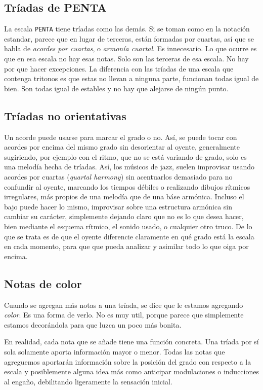 \documentclass[]{article}
\begin{document}
\subsection{Tríadas de PENTA}

La escala \texttt{PENTA} tiene tríadas como las demás. Si se toman como en la notación estandar, parece que en lugar de terceras, están formadas por cuartas, así que se habla de \emph{acordes por cuartas}, o \emph{armonía cuartal}. Es innecesario. Lo que ocurre es que en esa escala no hay esas notas. Solo son las terceras de esa escala. No hay por que hacer excepciones. La diferencia con las tríadas de una escala que contenga tritonos es que estas no llevan a ninguna parte, funcionan todas igual de bien. Son todas igual de estables y no hay que alejarse de ningún punto.

\subsection{Tríadas no orientativas}

Un acorde puede usarse para marcar el grado o no. Así, se puede tocar con acordes por encima del mismo grado sin desorientar al oyente, generalmente sugiriendo, por ejemplo con el ritmo, que no se está variando de grado, solo es una melodía hecha de tríadas. Así, los músicos de jazz, suelen improvisar usando acordes por cuartas (\emph{quartal harmony}) sin acentuarlos demasiado para no confundir al oyente, marcando los tiempos débiles o realizando dibujos rítmicos irregulares, más propios de una melodía que de una báse armónica. Incluso el bajo puede hacer lo mismo, improvisar sobre una estructura armónica sin cambiar su carácter, simplemente dejando claro que no es lo que desea hacer, bien mediante el esquema rítmico, el sonido usado, o cualquier otro truco. De lo que se trata es de que el oyente diferencie claramente en qué grado está la escala en cada momento, para que que pueda analizar y asimilar todo lo que oiga por encima.

\subsection{Notas de color}

Cuando se agregan más notas a una tríada, se dice que le estamos agregando \emph{color}. Es una forma de verlo. No es muy util, porque parece que simplemente estamos decorándola para que luzca un poco más bonita.

En realidad, cada nota que se añade tiene una función concreta. Una tríada por sí sola solamente aporta información mayor o menor. Todas las notas que agreguemos aportarán información sobre la posición del grado con respecto a la escala y posiblemente alguna idea más como anticipar modulaciones o inducciones al engaño, debilitando ligeramente la sensación inicial.
\end{document}
